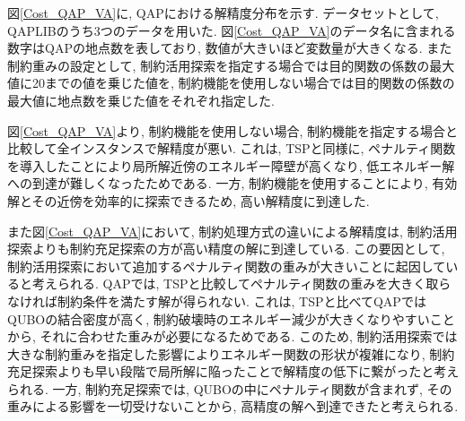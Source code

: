 \documentclass[submit,techrep,noauthor]{ipsj}
\begin{document}
図\ref{Cost_QAP_VA}に, QAPにおける解精度分布を示す. データセットとして, QAPLIB\cite{qaplib}のうち3つのデータを用いた. 図\ref{Cost_QAP_VA}のデータ名に含まれる数字はQAPの地点数を表しており, 数値が大きいほど変数量が大きくなる. また制約重みの設定として, 制約活用探索を指定する場合では目的関数の係数の最大値に20までの値を乗じた値を, 制約機能を使用しない場合では目的関数の係数の最大値に地点数を乗じた値をそれぞれ指定した.

図\ref{Cost_QAP_VA}より, 制約機能を使用しない場合, 制約機能を指定する場合と比較して全インスタンスで解精度が悪い. これは, TSPと同様に, ペナルティ関数を導入したことにより局所解近傍のエネルギー障壁が高くなり, 低エネルギー解への到達が難しくなったためである. 一方, 制約機能を使用することにより, 有効解とその近傍を効率的に探索できるため, 高い解精度に到達した.

また図\ref{Cost_QAP_VA}において, 制約処理方式の違いによる解精度は, 制約活用探索よりも制約充足探索の方が高い精度の解に到達している. この要因として, 制約活用探索において追加するペナルティ関数の重みが大きいことに起因していると考えられる. QAPでは, TSPと比較してペナルティ関数の重みを大きく取らなければ制約条件を満たす解が得られない. これは, TSPと比べてQAPではQUBOの結合密度が高く, 制約破壊時のエネルギー減少が大きくなりやすいことから, それに合わせた重みが必要になるためである. このため, 制約活用探索では大きな制約重みを指定した影響によりエネルギー関数の形状が複雑になり, 制約充足探索よりも早い段階で局所解に陥ったことで解精度の低下に繋がったと考えられる. 一方, 制約充足探索では, QUBOの中にペナルティ関数が含まれず, その重みによる影響を一切受けないことから, 高精度の解へ到達できたと考えられる.

\end{document}

